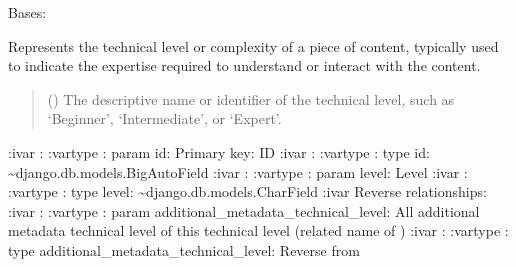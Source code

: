 \documentclass[letterpaper,10pt,english]{sphinxmanual}
\begin{document}

\begin{fulllineitems}
\label{\detokenize{source/meta_models_management:meta_models_management.models.TechnicalLevel}}
\pysigstartsignatures
{}
\pysigstopsignatures
\sphinxAtStartPar
Bases: 

\sphinxAtStartPar
Represents the technical level or complexity of a piece of content, typically used to indicate the expertise required to understand or interact with the content.
\begin{quote}\begin{description}
\sphinxAtStartPar
{} () \textendash{} The descriptive name or identifier of the technical level, such as ‘Beginner’, ‘Intermediate’, or ‘Expert’.

\end{description}\end{quote}

\sphinxAtStartPar
:ivar : 
:vartype : param id: Primary key: ID
:ivar : 
:vartype : type id: \textasciitilde{}django.db.models.BigAutoField
:ivar : 
:vartype : param level: Level
:ivar :
:vartype : type level: \textasciitilde{}django.db.models.CharField
:ivar Reverse relationships:
:ivar : 
:vartype : param additional\_metadata\_technical\_level: All additional metadata technical level of this technical level (related name of )
:ivar : 
:vartype : type additional\_metadata\_technical\_level: Reverse  from {\hyperref[\detokenize{source/meta_models_management:meta_models_management.models.AdditionalMetadata}]{}}


\end{fulllineitems}
\end{document}
